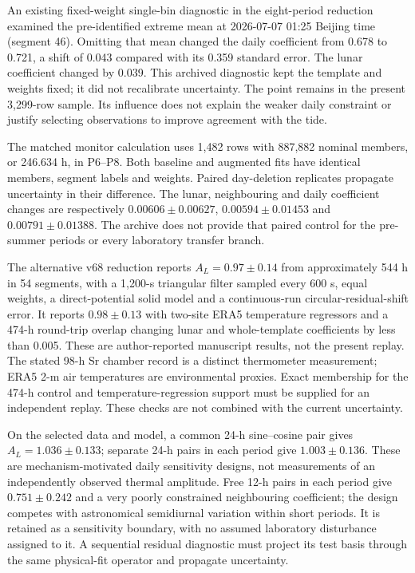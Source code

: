 \documentclass[
  10pt,
  a4paper,
]{article}
\begin{document}
An existing fixed-weight single-bin diagnostic in the eight-period
reduction examined the pre-identified extreme mean at 2026-07-07 01:25
Beijing time (segment 46). Omitting that mean changed the daily
coefficient from 0.678 to 0.721, a shift of 0.043 compared with its
0.359 standard error. The lunar coefficient changed by 0.039. This
archived diagnostic kept the template and weights fixed; it did not
recalibrate uncertainty. The point remains in the present 3,299-row
sample. Its influence does not explain the weaker daily constraint or
justify selecting observations to improve agreement with the tide.

The matched monitor calculation uses 1,482 rows with 887,882 nominal
members, or 246.634 h, in P6--P8. Both baseline and augmented fits have
identical members, segment labels and weights. Paired day-deletion
replicates propagate uncertainty in their difference. The lunar,
neighbouring and daily coefficient changes are respectively
\(0.00606\pm0.00627\), \(0.00594\pm0.01453\) and \(0.00791\pm0.01388\).
The archive does not provide that paired control for the pre-summer
periods or every laboratory transfer branch.

The alternative v68 reduction reports \(A_L=0.97\pm0.14\) from
approximately 544 h in 54 segments, with a 1,200-s triangular filter
sampled every 600 s, equal weights, a direct-potential solid model and a
continuous-run circular-residual-shift error. It reports \(0.98\pm0.13\)
with two-site ERA5 temperature regressors and a 474-h round-trip overlap
changing lunar and whole-template coefficients by less than 0.005. These
are author-reported manuscript results, not the present replay. The
stated 98-h Sr chamber record is a distinct thermometer measurement;
ERA5 2-m air temperatures are environmental proxies. Exact membership
for the 474-h control and temperature-regression support must be
supplied for an independent replay. These checks are not combined with
the current uncertainty.

On the selected data and model, a common 24-h sine--cosine pair gives
\(A_L=1.036\pm0.133\); separate 24-h pairs in each period give
\(1.003\pm0.136\). These are mechanism-motivated daily sensitivity
designs, not measurements of an independently observed thermal
amplitude. Free 12-h pairs in each period give \(0.751\pm0.242\) and a
very poorly constrained neighbouring coefficient; the design competes
with astronomical semidiurnal variation within short periods. It is
retained as a sensitivity boundary, with no assumed laboratory
disturbance assigned to it. A sequential residual diagnostic must
project its test basis through the same physical-fit operator and
propagate uncertainty.
\end{document}
